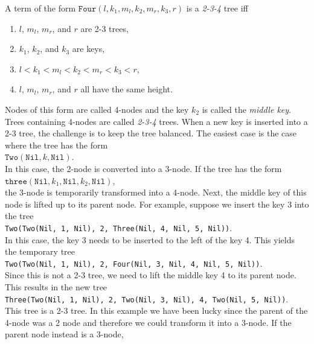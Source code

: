 A term of the form $\mathtt{Four}(l,k_1,m_l, k_2, m_r, k_3, r)$ is a \emph{2-3-4} tree iff
\begin{enumerate}
\item $l$, $m_l$, $m_r$, and $r$ are 2-3 trees,
\item $k_1$, $k_2$, and $k_3$ are keys,
\item $l < k_1 < m_l < k_2 < m_r < k_3 < r$,
\item $l$, $m_l$, $m_r$, and $r$ all have the same height.
\end{enumerate}
Nodes of this form are called 4-nodes and the key $k_2$ is called the \emph{middle key}.
Trees containing 4-nodes are called \emph{2-3-4} trees.
When a new key is inserted into a 2-3 tree, the challenge is to keep the tree balanced.  The easiest
case is the case where the tree has the form
\\[0.2cm]
\hspace*{1.3cm}
$\mathtt{Two}(\mathtt{Nil}, k, \mathtt{Nil})$.
\\[0.2cm]
In this case, the 2-node is converted into a 3-node.  If the tree has the form 
\\[0.2cm]
\hspace*{1.3cm}
$\mathtt{three}(\mathtt{Nil}, k_1, \mathtt{Nil}, k_2, \mathtt{Nil})$,
\\[0.2cm]
the 3-node is temporarily transformed into a 4-node.  Next, the middle key of this node is lifted up
to its parent node.  For example, suppose we insert the key 3 into the tree
\\[0.2cm]
\hspace*{1.3cm}
\texttt{Two(Two(Nil, 1, Nil), 2, Three(Nil, 4, Nil, 5, Nil))}.
\\[0.2cm]
In this case, the key 3 needs to be inserted to the left of the key 4.  This yields the temporary tree 
\\[0.2cm]
\hspace*{1.3cm}
\texttt{Two(Two(Nil, 1, Nil), 2, Four(Nil, 3, Nil, 4, Nil, 5, Nil))}.
\\[0.2cm]
Since this is not a 2-3 tree, we need to lift the middle key 4 to its parent node.  This results in
the new tree
\\[0.2cm]
\hspace*{1.3cm}
\texttt{Three(Two(Nil, 1, Nil), 2, Two(Nil, 3, Nil), 4, Two(Nil, 5, Nil))}.
\\[0.2cm]
This tree is a 2-3 tree.  In this example we have been lucky since the parent of the 4-node was
a 2 node and therefore we could transform it into a 3-node.  If the parent node instead is a 3-node,

